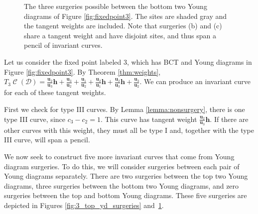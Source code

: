 \documentclass[pdftex]{sigma}
\numberwithin{equation}{section}
\newcommand{\brane}{\mathcal D}
\newcommand{\hb}{\mathbf h}
\newcommand{\ub}{\mathbf u}
\DeclareMathOperator{\bowvar}{\mathcal C}
\begin{document}
\begin{figure}[th!]
{
}
\hspace*{\fill}

\caption{The three surgeries possible between the bottom two Young diagrams of Figure \ref{fig:fixedpoint3}. The sites are shaded gray and the tangent weights are included. Note that surgeries (b) and (c) share a tangent weight and have disjoint sites, and thus span a pencil of invariant curves.}
\label{fig:3_bottom_yd_surgeries}
\end{figure}

Let us consider the fixed point labeled $3$, which has BCT and Young diagrams in Figure \ref{fig:fixedpoint3}. By Theorem \ref{thm:weights}, $T_{3}\bowvar(\brane) = \frac{\ub_2}{\ub_3}\hb + \frac{\ub_3}{\ub_2} + \frac{\ub_1}{\ub_2} + \frac{\ub_2}{\ub_1}\hb + \frac{\ub_2}{\ub_3}\hb + \frac{\ub_3}{\ub_2}$. We can produce an invariant curve for each of these tangent weights.

First we check for type III curves. By Lemma \ref{lemma:nonsurgery}, there is one type III curve, since $c_3-c_2=1$. This curve has tangent weight $\frac{\ub_2}{\ub_3}\hb$. If there are other curves with this weight, they must all be type I and, together with the type III curve, will span a pencil.

We now seek to construct five more invariant curves that come from Young diagram surgeries. To do this, we will consider surgeries between each pair of Young diagrams separately. There are two surgeries between the top two Young diagrams, three surgeries between the bottom two Young diagrams, and zero surgeries between the top and bottom Young diagrams. These five surgeries are depicted in Figures \ref{fig:3_top_yd_surgeries} and~\ref{fig:3_bottom_yd_surgeries}.
\end{document}
